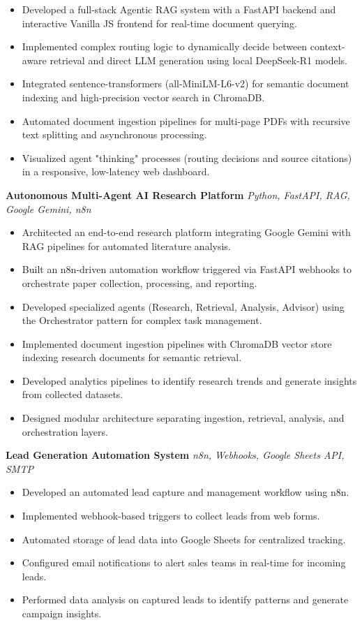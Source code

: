 \documentclass[10pt]{article}
\begin{document}
\begin{itemize}[leftmargin=*, itemsep=2pt]
\item Developed a full-stack Agentic RAG system with a FastAPI backend and interactive Vanilla JS frontend for real-time document querying.
\item Implemented complex routing logic to dynamically decide between context-aware retrieval and direct LLM generation using local DeepSeek-R1 models.
\item Integrated sentence-transformers (all-MiniLM-L6-v2) for semantic document indexing and high-precision vector search in ChromaDB.
\item Automated document ingestion pipelines for multi-page PDFs with recursive text splitting and asynchronous processing.
\item Visualized agent "thinking" processes (routing decisions and source citations) in a responsive, low-latency web dashboard.
\end{itemize}

\textbf{Autonomous Multi-Agent AI Research Platform} \hfill \textit{Python, FastAPI, RAG, Google Gemini, n8n}

\begin{itemize}[leftmargin=*, itemsep=2pt]
\item Architected an end-to-end research platform integrating Google Gemini with RAG pipelines for automated literature analysis.
\item Built an n8n-driven automation workflow triggered via FastAPI webhooks to orchestrate paper collection, processing, and reporting.
\item Developed specialized agents (Research, Retrieval, Analysis, Advisor) using the Orchestrator pattern for complex task management.
\item Implemented document ingestion pipelines with ChromaDB vector store indexing research documents for semantic retrieval.
\item Developed analytics pipelines to identify research trends and generate insights from collected datasets.
\item Designed modular architecture separating ingestion, retrieval, analysis, and orchestration layers.
\end{itemize}

\textbf{Lead Generation Automation System} \hfill \textit{n8n, Webhooks, Google Sheets API, SMTP}

\begin{itemize}[leftmargin=*, itemsep=2pt]
\item Developed an automated lead capture and management workflow using n8n.
\item Implemented webhook-based triggers to collect leads from web forms.
\item Automated storage of lead data into Google Sheets for centralized tracking.
\item Configured email notifications to alert sales teams in real-time for incoming leads.
\item Performed data analysis on captured leads to identify patterns and generate campaign insights.
\end{itemize}
\end{document}
